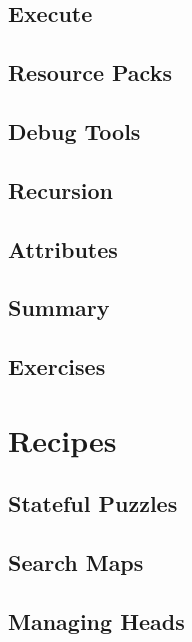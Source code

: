 \documentclass[oneside]{book}
\begin{document}
\section{Execute}
\blindtext

\section{Resource Packs}
\blindtext

\section{Debug Tools}
\blindtext

\section{Recursion}
\blindtext

\section{Attributes}
\blindtext

\section{Summary}
\blindtext

\section{Exercises}
\blindtext

\chapter{Recipes}

\section{Stateful Puzzles}
\blindtext

\section{Search Maps}
\blindtext

\section{Managing Heads}
\blindtext


\end{document}
